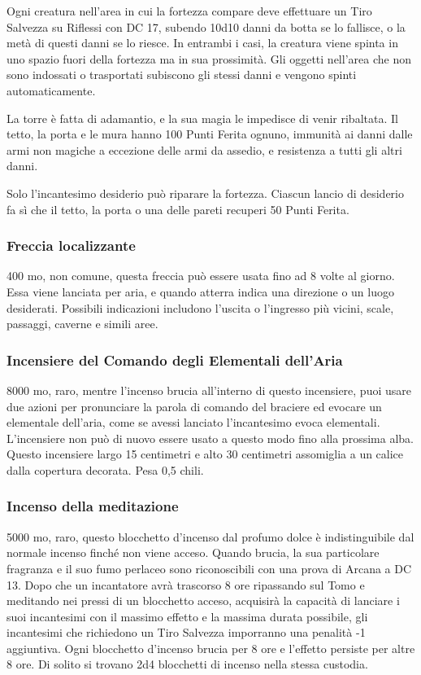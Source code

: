 \begin{multicols}{2}
	Ogni creatura nell'area in cui la fortezza compare deve effettuare un Tiro Salvezza su Riflessi con DC 17, subendo 10d10 danni da botta se lo fallisce, o la metà di questi danni se lo riesce. In entrambi i casi, la creatura viene spinta in uno spazio fuori della fortezza ma in sua prossimità. Gli oggetti nell'area che non sono indossati o trasportati subiscono gli stessi danni e vengono spinti automaticamente.

	La torre è fatta di adamantio, e la sua magia le impedisce di venir ribaltata. Il tetto, la porta e le mura hanno 100 Punti Ferita ognuno, immunità ai danni dalle armi non magiche a eccezione delle armi da assedio, e resistenza a tutti gli altri danni.

	Solo l'incantesimo desiderio può riparare la fortezza. Ciascun lancio di desiderio fa sì che il tetto, la porta o una delle pareti recuperi 50 Punti Ferita.


	\subsubsection*{Freccia localizzante}
	400 mo, non comune, questa freccia può essere usata fino ad 8 volte al giorno. Essa viene lanciata per aria, e quando atterra indica una direzione o un luogo desiderati. Possibili indicazioni includono l'uscita o l'ingresso più vicini, scale, passaggi, caverne e simili aree.

	\subsubsection*{Incensiere del Comando degli Elementali dell'Aria}
	8000 mo, raro, mentre l'incenso brucia all'interno di questo incensiere, puoi usare due azioni per pronunciare la parola di comando del braciere ed evocare un elementale dell'aria, come se avessi lanciato l'incantesimo evoca elementali. L'incensiere non può di nuovo essere usato a questo modo fino alla prossima alba. Questo incensiere largo 15 centimetri e alto 30 centimetri assomiglia a un calice dalla copertura decorata. Pesa 0,5 chili.

	\subsubsection*{Incenso della meditazione}
	5000 mo, raro, questo blocchetto d’incenso dal profumo dolce è indistinguibile dal normale incenso finché non viene acceso. Quando brucia, la sua particolare fragranza e il suo fumo perlaceo sono riconoscibili con una prova di Arcana a DC 13. Dopo che un incantatore avrà trascorso 8 ore ripassando sul Tomo e meditando nei pressi di un blocchetto acceso, acquisirà la capacità di lanciare i suoi incantesimi con il massimo effetto e la massima durata possibile, gli incantesimi che richiedono un Tiro Salvezza imporranno una penalità -1 aggiuntiva. Ogni blocchetto d’incenso brucia per 8 ore e l’effetto persiste per altre 8 ore. Di solito si trovano 2d4 blocchetti di incenso nella stessa custodia.


\end{multicols}
